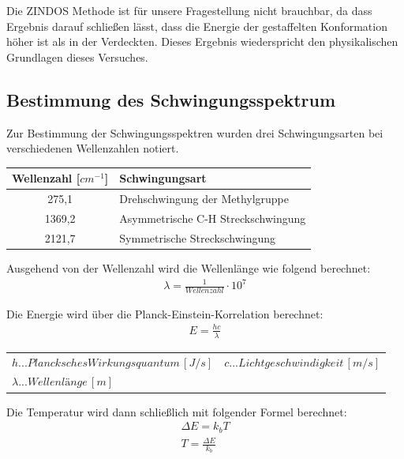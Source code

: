Die ZINDOS Methode ist für unsere Fragestellung nicht brauchbar, da dass Ergebnis darauf schließen lässt, dass die Energie der gestaffelten Konformation
höher ist als in der Verdeckten. Dieses Ergebnis wiederspricht den physikalischen Grundlagen dieses Versuches. 

\subsection{Bestimmung des Schwingungsspektrum}
Zur Bestimmung der Schwingungsspektren wurden drei Schwingungsarten bei verschiedenen Wellenzahlen notiert.

\begin{table}[H]
    \centering
    \begin{tabular}{cl}
        \toprule 
        Wellenzahl [$cm^{-1}$] & Schwingungsart \\
        \midrule
        275,1	& Drehschwingung der Methylgruppe \\
        1369,2	& Asymmetrische C-H Streckschwingung \\
        2121,7	& Symmetrische Streckschwingung  \\
        \bottomrule
    \end{tabular}
\end{table}
Ausgehend von der Wellenzahl wird die Wellenlänge wie folgend berechnet:
\begin{align}
    \lambda = \frac{1}{Wellenzahl} \cdot 10^7
\end{align}

Die Energie wird über die Planck-Einstein-Korrelation berechnet:
\begin{align}
    E = \frac{hc}{\lambda}
\end{align}

\begin{table}[H]
    \centering
    \begin{tabular}{ll}
        $h...Plancksches Wirkungsquantum \, [J/s]$ & $c...Lichtgeschwindigkeit \, [m/s]$ \\
        $\lambda...Wellenlänge \, [m]$ &  \\
    \end{tabular}
\end{table}

Die Temperatur wird dann schließlich mit folgender Formel berechnet:
\begin{align*}
    \Delta E = k_b T \\
    T = \frac{\Delta E}{k_b}
\end{align*}


